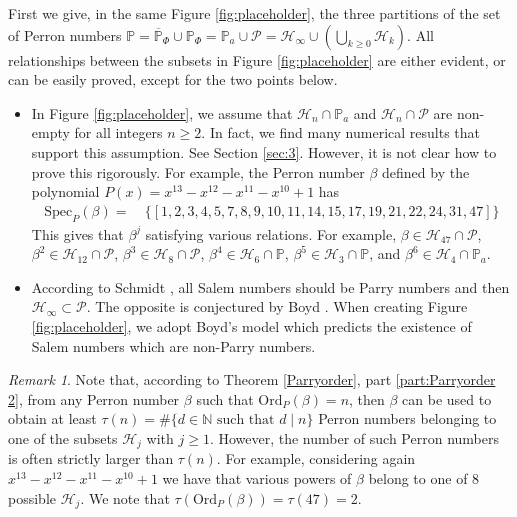 \documentclass[12pt]{article}
\theoremstyle{plain}
\theoremstyle{remark}
\newtheorem{remark}[theorem]{Remark}
\newcommand{\OrdP}{\mathrm{Ord}_{P}}
\newcommand{\SpecP}{\mathrm{Spec}_{P}}
\begin{document}
First we give, in the same Figure \ref{fig:placeholder}, the three partitions of the set of Perron numbers $\mathbb{P}=\overline{\mathbb{P}}_\Phi\cup\mathbb{P}_\Phi=\mathbb{P}_a\cup \mathcal{P}=\mathcal{H}_\infty \cup (\bigcup_{k\geq 0}{\mathcal{H}_k})$. All relationships between the subsets in Figure \ref{fig:placeholder} are either evident, or can be easily proved, except for the two points below.
\begin{itemize}
 \item In Figure \ref{fig:placeholder}, we assume that $\mathcal{H}_n\cap \mathbb{P}_a$ and $\mathcal{H}_n\cap \mathcal{P} $ are non-empty for all integers $n\geq 2$. In fact, we find many numerical results that support this assumption. See Section \ref{sec:3}. However, it is not clear how to prove this rigorously. For example, the Perron number $\beta$ defined by the polynomial $P(x)=x^{13}-x^{12}-x^{11}-x^{10}+1$ has 
 \begin{align*}
     \SpecP(\beta) =\  & \{[1, 2, 3, 4, 5, 7, 8, 9, 10, 11, 14, 15, 17, 19, 21, 22
, 24, 31, 47]\}
 \end{align*}
This gives that $\beta^j$ satisfying various relations.
For example,  $\beta \in \mathcal{H}_{47} \cap \mathcal{P}$,
$\beta^2 \in \mathcal{H}_{12} \cap \mathcal{P}$,
$\beta^3 \in \mathcal{H}_{8} \cap \mathcal{P}$, 
$\beta^{4} \in \mathcal{H}_{6} \cap \mathbb{P}$,
$\beta^{5} \in \mathcal{H}_{3} \cap \mathbb{P}$, and 
$\beta^{6} \in \mathcal{H}_{4} \cap \mathbb{P}_a$.
\item According to Schmidt \cite{Sch80}, all Salem numbers should be Parry numbers and then $\mathcal{H}_\infty \subset\mathcal{P}$. The opposite is conjectured by Boyd \cite{Boyd1996}. When creating Figure \ref{fig:placeholder}, we adopt Boyd's model which predicts the existence of Salem numbers which are non-Parry numbers.
\end{itemize}

\begin{remark}
 Note that, according to Theorem \ref{Parryorder}, part \ref{part:Parryorder 2}, from any Perron number $\beta $ such that $\OrdP(\beta)= n $, then $\beta $ can be used to obtain at least $\tau(n)= \# \{ d \in \mathbb{N} \text{ such that } d \mid n \}$ Perron numbers belonging to one of the subsets $\mathcal{H}_j$ with $j \geq 1 $. However, the number of such Perron numbers is often strictly larger than $\tau(n)$. For example, considering again $x^{13}-x^{12}-x^{11}-x^{10}+1$ we have that various powers of $\beta$ belong to one of 8 possible $\mathcal{H}_j$. 
 We note that $\tau(\OrdP(\beta)) = \tau(47) = 2$. 
 \end{remark}
\end{document}
